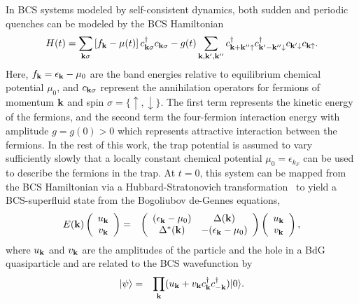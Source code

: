 \documentclass[aps,pra,floats,epsfig,pdflatex]{revtex4}                                                              %
\begin{document}
 {In BCS systems modeled by self-consistent dynamics, both sudden and periodic quenches can be modeled by the BCS Hamiltonian}
\begin{equation}
H(t) = \sum_{{\bf k}\sigma} \left[ f_{\bf
k}-\mu(t)\right]c^\dagger_{{\bf k}\sigma}c_{{\bf k}\sigma}-g(t) \sum_{{\bf k}, {\bf k'},{\bf k''}} c^\dagger_{{\bf k}+{\bf
k''}\uparrow} c^\dagger_{{\bf k'}-{\bf k''}\downarrow} c_{{\bf
k'}\downarrow} c_{{\bf k}\uparrow}. \label{fermiham}
\end{equation}
 {Here, $f_{\bf k}=\epsilon_{\bf k}-\mu_0$ are the band energies relative to equilibrium chemical potential $\mu_0$, and $c_{{\bf k}\sigma}$ represent the annihilation operators for fermions of momentum ${\bf k}$ and spin $\sigma=\{\uparrow, \downarrow\}$. The first term represents the kinetic energy of the fermions, and the second term the four-fermion interaction energy with amplitude $g=g(0)>0$ which represents attractive interaction between the fermions. In the rest of this work, the trap potential is assumed to vary sufficiently slowly that a locally constant chemical potential $\mu_0 = \epsilon_{k_F}$ can be used to describe the fermions in the trap. At $t=0$, this system can be mapped from the BCS Hamiltonian via  a Hubbard-Stratonovich transformation}~\cite{hubbard:hstrans,coleman}  {to yield a BCS-superfluid state from the Bogoliubov de-Gennes equations,}
\begin{eqnarray}
E({\bf k})\left(\begin{array}{c} u_{\bf k} \\ v_{\bf k}
\end{array} \right) &=& \left(
\begin{array}{cc}
(\epsilon_{\bf k}-\mu_0) & \Delta({\bf k})\\
\Delta^{\ast}({\bf k}) & -(\epsilon_{\bf k}-\mu_0)
\end{array} \right) \left(\begin{array}{c} u_{\bf k} \\ v_{\bf k}
\end{array} \right), \nonumber\\ \label{bdg1}
\end{eqnarray}
where $u_{\bf k}$ and $v_{\bf k}$ are the amplitudes of the particle and the hole in a BdG quasiparticle and are related to the BCS
wavefunction by
\begin{eqnarray}
|\psi\rangle &=& \prod_{\bf k} (u_{\bf k} + v_{\bf k} c_{\bf
k}^{\dagger} c_{{\bf -k}}^{\dagger}) |0\rangle. \label{bcswav}
\end{eqnarray}
\end{document}
